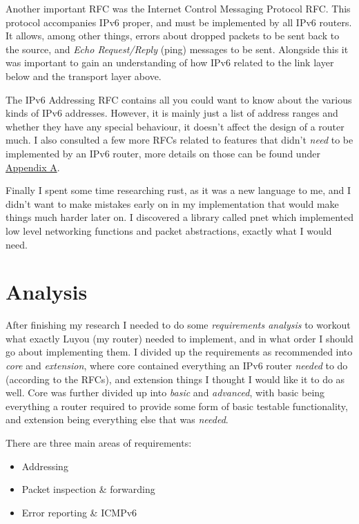 \documentclass[12pt,a4paper,twoside,openright]{report}
\begin{document}
\bigskip

Another important RFC was the Internet Control Messaging Protocol RFC\cite{icmpv6_rfc}.  This protocol accompanies IPv6 proper, and must be implemented by all IPv6 routers.  It allows, among other things, errors about dropped packets to be sent back to the source, and \textit{Echo Request/Reply} (ping) messages to be sent.  Alongside this it was important to gain an understanding of how IPv6 related to the link layer below and the transport layer above.

\bigskip

The IPv6 Addressing RFC\cite{ipv6_rfc_adr} contains all you could want to know about the various kinds of IPv6 addresses. However, it is mainly just a list of address ranges and whether they have any special behaviour, it doesn't affect the design of a router much.  I also consulted a few more RFCs related to features that didn't \textit{need} to be implemented by an IPv6 router, more details on those can be found under \hyperref[appendix::requirements]{Appendix A}.

\bigskip

Finally I spent some time researching rust, as it was a new language to me, and I didn't want to make mistakes early on in my implementation that would make things much harder later on.  I discovered a library called pnet\cite{pnet_rust} which implemented low level networking functions and packet abstractions, exactly what I would need.

\section{Analysis}

After finishing my research I needed to do some \textit{requirements analysis} to workout what exactly Luyou (my router) needed to implement, and in what order I should go about implementing them.  I divided up the requirements as recommended into \textit{core} and \textit{extension}, where core contained everything an IPv6 router \textit{needed} to do (according to the RFCs), and extension things I thought I would like it to do as well.  Core was further divided up into \textit{basic} and \textit{advanced}, with basic being everything a router required to provide some form of basic testable functionality, and extension being everything else that was \textit{needed}.

\bigskip

There are three main areas of requirements:
\begin{itemize}
\item Addressing
\item Packet inspection \& forwarding
\item Error reporting \& ICMPv6\cite{icmpv6_rfc}
\end{itemize}
\end{document}
